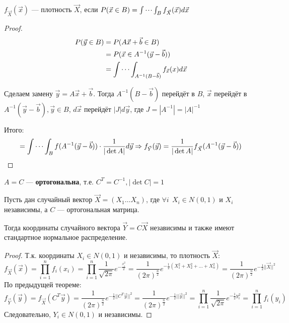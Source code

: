 \begin{remark}
    \(f_{ \vec{X}}(\vec{x})\) --- плотность \(\vec{X}\), если \(P(\vec{x} \in B) = \idotsint_{B} f_{ \vec{X}}(\vec{x}) d \vec{x}\)
\end{remark}

\begin{proof}
    \begin{align*}
        P(\vec{y} \in B) & = P(A \vec{x} + \vec{b} \in B)                              \\
                         & = P(\vec{x} \in A^{-1}(\vec{y} - \vec{b}))                  \\
                         & = \idotsint_{A^{-1}(B - \vec{b})} f_{ \vec{x}}(x) d \vec{x}
    \end{align*}

    Сделаем замену \(\vec{y} = A \vec{x} + \vec{b}\). Тогда \(A^{-1}(B - \vec{b})\) перейдёт в \(B\), \(\vec{x}\) перейдёт в \(A^{-1}(\vec{y} - \vec{b}), \vec{y} \in B\), \(d \vec{x}\) перейдёт  \(|J| d \vec{y}\), где \(J = |A^{-1}| = |A|^{ - 1}\)

    Итого:
    \[ = \idotsint_B f(A^{-1}(\vec{y} - \vec{b})) \cdot \frac{1}{|\det A|} d \vec{y} \Rightarrow f_{ \vec{Y}}(\vec{y}) = \frac{1}{|\det A|} f_{ \vec{X}}(A^{-1}(\vec{y} - \vec{b}))\]
\end{proof}

\begin{definition}
    \(A = C\) --- \textbf{ортогональна}, т.е. \(C^T = C^{-1}, |\det C| = 1\)
\end{definition}

\begin{theorem}
    Пусть дан случайный вектор \(\vec{X} = (X_1 \dots X_n)\), где \(\forall i \ \ X_i \in N(0, 1)\) и \(X_i\) независимы, а \(C\) --- ортогональная матрица.

    Тогда координаты случайного вектора \(\vec{Y} = C \vec{X}\) независимы и также имеют стандартное нормальное распределение.
\end{theorem}
\begin{proof}
    Т.к. координаты \(X_i \in N(0, 1)\) и независимы, то плотность \(\vec{X}\):
    \[f_{ \vec{X}}(\vec{x}) = \prod_{i=1}^{n} f_i (x_i) = \prod_{i=1}^{n} \frac{1}{\sqrt{2 \pi}} e^{ - \frac{x_i^2}{2}} = \frac{1}{(2 \pi)^{\frac{n}{2}}} e^{ - \frac{1}{2} (X_1^2 + X_2^2 + \dots + X_n^2)} = \frac{1}{(2 \pi)^{\frac{n}{2}}} e^{ - \frac{1}{2} ||\vec{X}||^2}\]
    По предыдущей теореме:
    \[f_{ \vec{Y}}(\vec{y}) = f_{ \vec{X}}(C^T \vec{y}) = \frac{1}{(2 \pi)^{\frac{n}{2}}} e^{ - \frac{1}{2} ||C^T \vec{y}||^2} = \frac{1}{(2 \pi)^{\frac{n}{2}}} e^{ - \frac{1}{2} ||\vec{y}||^2} = \prod_{i=1}^{n} \frac{1}{\sqrt{2 \pi}} e^{ - \frac{1}{2} y_i^2} = \prod_{i=1}^{n} f_i(y_i)\]
    Следовательно, \(Y_i \in N(0, 1)\) и независимы.
\end{proof}

